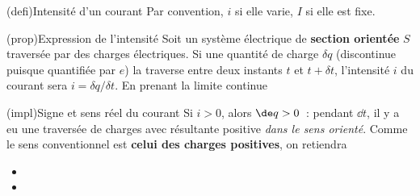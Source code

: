 \documentclass[../../main/main.tex]{subfiles}
\begin{document}
\begin{tcb*}[label=def:intensité, sidebyside](defi){Intensité
			d'un courant}
	\tcblower
	Par convention, $i$ si elle varie, $I$ si elle est fixe.
\end{tcb*}
\begin{tcb*}[label=prop:intensité](prop){Expression de l'intensité}
	Soit un système électrique de \textbf{section orientée} $S$ traversée par
	des charges électriques. Si une quantité de charge $\delta q$ (discontinue
	puisque quantifiée par $e$) la traverse entre deux instants $t$ et $t + \delta
		t$, l'intensité $i$ du courant sera $i = \delta q/\delta t$. En prenant
	la limite continue
	\psw{%
		\[
			\boxed{
				i(t) =
				\lim_{\delta t \ra 0} \frac{\delta q}{\delta t} =
				\dv{q}{t}
			}%
		\]
	}%
	\vspace{-15pt}
\end{tcb*}
\begin{tcb*}[label=impl:intensconv](impl){Signe et sens réel du courant}
	Si $i > 0$, alors $\de q > 0$~: pendant $\dd{t}$, il y a eu une traversée
	de charges avec résultante positive \textit{dans le sens orienté}. Comme le
	sens conventionnel est \textbf{celui des charges positives}, on retiendra
	\begin{itemize}
		\item {}%
		\item {}%
	\end{itemize}
\end{tcb*}
\end{document}
